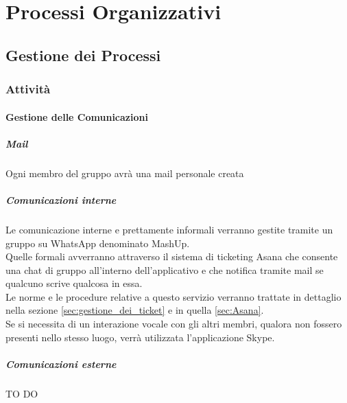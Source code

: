 %



\section{Processi Organizzativi}

	\subsection{Gestione dei Processi}
		\subsubsection{Attività}
			\paragraph{Gestione delle Comunicazioni}
					\subparagraph{Mail}
					Ogni membro del gruppo avrà una mail personale creata			
				\subparagraph{Comunicazioni interne}
Le comunicazione interne e prettamente informali verranno gestite tramite un gruppo su WhatsApp denominato MashUp. \\
Quelle formali avverranno attraverso il sistema di ticketing Asana che consente una chat di gruppo all'interno 		dell'applicativo e che notifica tramite mail se qualcuno scrive qualcosa in essa. \\
Le norme e le procedure relative a questo servizio verranno trattate in dettaglio nella sezione \ref{sec:gestione_dei_ticket} e in quella \ref{sec:Asana}. \\
Se si necessita di un interazione vocale con gli altri membri, qualora non fossero presenti nello stesso luogo, verrà utilizzata l'applicazione Skype.
				\subparagraph{Comunicazioni esterne}
TO DO				
